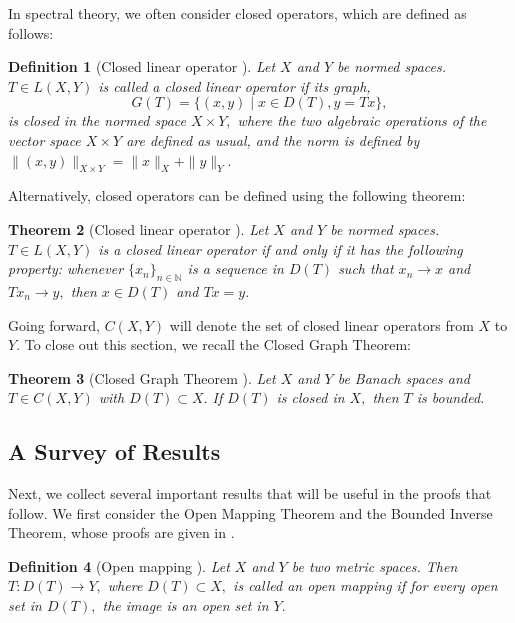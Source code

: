 \documentclass[12pt,a4paper]{article}
\theoremstyle{boldthm}
\newtheorem{theorem}{Theorem}[section]
\theoremstyle{bolddefn}
\newtheorem{definition}[theorem]{Definition}
\begin{document}
In spectral theory, we often consider closed operators, which are defined as follows:
\begin{definition}[{Closed linear operator \cite[4.13-1]{krey}}] 
     Let $X$ and $Y$ be normed spaces.  $T \in L(X, Y)$ is called a closed linear operator if its graph,
    \begin{equation}
        G(T) = \{(x, y) \mid x \in D(T), y = Tx\},
    \end{equation}
    is closed in the normed space $X \times Y,$ where the two algebraic operations of the vector space $X \times Y$ are defined as usual, and the norm is defined by $\|(x, y)\|_{X \times Y} = \|x\|_{X} + \|y \|_{Y}.$ 
\end{definition}
Alternatively, closed operators can be defined using the following theorem:
\begin{theorem}[{Closed linear operator \cite[4.13-3]{krey}}]\label{closed}
     Let $X$ and $Y$ be normed spaces. $T \in L(X, Y)$ is a closed linear operator if and only if it has the following property: whenever $\{x_n\}_{n \in \mathbb{N}}$ is a sequence in $D(T)$ such that $x_n \rightarrow x$ and $Tx_n \rightarrow y,$ then $x \in D(T)$ and $Tx = y.$
\end{theorem}
Going forward, $C(X, Y)$ will denote the set of closed linear operators from $X$ to $Y.$ To close out this section, we recall the Closed Graph Theorem:
\begin{theorem}[{Closed Graph Theorem \cite[4.13-2]{krey}}]  \label{CGT}
    Let $X$ and $Y$ be Banach spaces and $T \in C(X, Y)$ with $D(T) \subset X.$ If $D(T)$ is closed in $X,$ then $T$ is bounded. 
\end{theorem}

\subsection{A Survey of Results}

Next, we collect several important results that will be useful in the proofs that follow. We first consider the Open Mapping Theorem and the Bounded Inverse Theorem, whose proofs are given in \cite{krey}.

\begin{definition}[{Open mapping \cite[4.12-1]{krey}}] 
    Let $X$ and $Y$ be two metric spaces. Then $T : D(T) \rightarrow Y,$ where $D(T) \subset X,$ is called an open mapping if for every open set in $D(T),$ the image is an open set in $Y.$
\end{definition}
\end{document}
